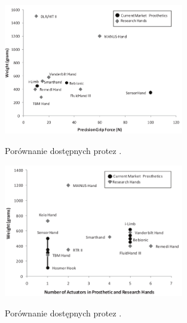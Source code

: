 \documentclass[8pt]{beamer}
\begin{document}
\begin{frame}%
	\begin{center}
		\begin{figure}
			\includegraphics[width=0.7\textwidth]{graphics/weight_gripforce.png}
			\label{graph:hand}	
			\caption{Porównanie dostępnych protez \cite{belter2011performance}.}
		\end{figure}
	\end{center}

\end{frame}
 
\begin{frame}%
	\begin{center}
		\begin{figure}
			\includegraphics[width=0.7\textwidth]{graphics/weight_actuators.png}
			\label{graph:hand}	
			\caption{Porównanie dostępnych protez \cite{belter2011performance}.}
		\end{figure}
	\end{center}

\end{frame}
\end{document}
